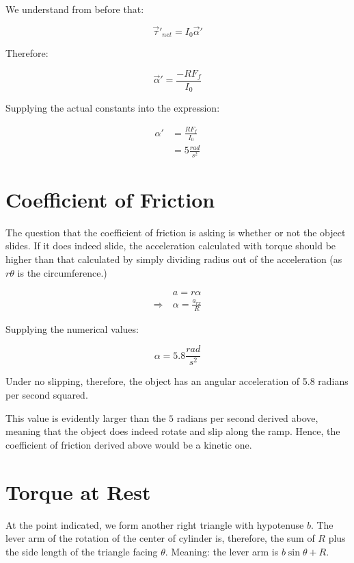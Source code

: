 \documentclass[letterpaper]{article}
\begin{document}
We understand from before that:

\begin{equation}
   \vec{\tau}'_{net} = I_{0} \vec{\alpha}' 
\end{equation}

Therefore:

\begin{equation}
   \vec{\alpha}' = \frac{- RF_f}{I_0} 
\end{equation}

Supplying the actual constants into the expression:

\begin{align}
   \alpha' &= \frac{RF_f}{I_0}\\
&= 5 \frac{rad}{s^2}
\end{align}

\section{Coefficient of Friction}
\label{sec:org72dee80}
The question that the coefficient of friction is asking is whether or not the object slides. If it does indeed slide, the acceleration calculated with torque should be higher than that calculated by simply dividing radius out of the acceleration (as \(r\theta\) is the circumference.)

\begin{align}
   &a = r\alpha \\
   \Rightarrow\ &\alpha = \frac{a_{rx}}{R} 
\end{align}

Supplying the numerical values:

\begin{equation}
   \alpha = 5.8 \frac{rad}{s^2} 
\end{equation}

Under no slipping, therefore, the object has an angular acceleration of 5.8 radians per second squared.

This value is evidently larger than the \(5\) radians per second derived above, meaning that the object does indeed rotate and slip along the ramp. Hence, the coefficient of friction derived above would be a kinetic one.

\section{Torque at Rest}
\label{sec:org45735b7}
At the point indicated, we form another right triangle with hypotenuse \(b\). The lever arm of the rotation of the center of cylinder is, therefore, the sum of \(R\) plus the side length of the triangle facing \(\theta\). Meaning: the lever arm is \(b\sin\theta + R\).
\end{document}
